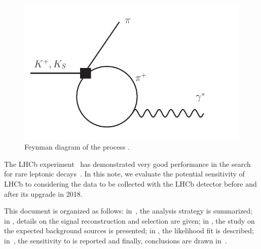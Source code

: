 \begin{figure} [htb!]
\begin{center}
\includegraphics[scale=0.5]{figs/Cirigliano_fig17.pdf} %
\caption{Feynman diagram of the process \Kzpizmm. \label{fig:diagram}}
\end{center}
\end{figure}

The LHCb experiment~\cite{LHCbDet} has demonstrated very good performance in the search for rare leptonic \KS decays~\cite{Ksmm}. In this note, we evaluate the potential
sensitivity of LHCb to \BRof\Kspizmm considering the data to be collected with the LHCb detector before and after its upgrade in 2018.
 
This document is organized as follows: in~, the analysis strategy is summarized; in , details on the signal reconstruction and selection are given;
in , the study on the expected background sources is presented; in , the likelihood fit is described; in~, the sensitivity to
\BRof\Kspizmm is reported and finally, conclusions are drawn in~.
